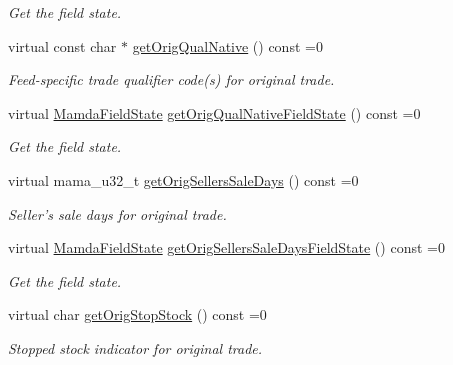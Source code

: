 \begin{CompactItemize}
\begin{CompactList}\small\item\em Get the field state. \item\end{CompactList}\item 
virtual const char $\ast$ \hyperlink{classWombat_1_1MamdaTradeCancelOrError_905aa15d1b3b2b36fe28b395e059231a}{get\-Orig\-Qual\-Native} () const =0
\begin{CompactList}\small\item\em Feed-specific trade qualifier code(s) for original trade. \item\end{CompactList}\item 
virtual \hyperlink{namespaceWombat_93aac974f2ab713554fd12a1fa3b7d2a}{Mamda\-Field\-State} \hyperlink{classWombat_1_1MamdaTradeCancelOrError_9ce7c8f5f35a4a4caacf5ed43637f067}{get\-Orig\-Qual\-Native\-Field\-State} () const =0
\begin{CompactList}\small\item\em Get the field state. \item\end{CompactList}\item 
virtual mama\_\-u32\_\-t \hyperlink{classWombat_1_1MamdaTradeCancelOrError_6df3a025f99a8d6328bcdda0fb4491f1}{get\-Orig\-Sellers\-Sale\-Days} () const =0
\begin{CompactList}\small\item\em Seller's sale days for original trade. \item\end{CompactList}\item 
virtual \hyperlink{namespaceWombat_93aac974f2ab713554fd12a1fa3b7d2a}{Mamda\-Field\-State} \hyperlink{classWombat_1_1MamdaTradeCancelOrError_75ac88d2442d768d3094a8263329adc2}{get\-Orig\-Sellers\-Sale\-Days\-Field\-State} () const =0
\begin{CompactList}\small\item\em Get the field state. \item\end{CompactList}\item 
virtual char \hyperlink{classWombat_1_1MamdaTradeCancelOrError_c7cf998aa454b310389b03c0b8be095e}{get\-Orig\-Stop\-Stock} () const =0
\begin{CompactList}\small\item\em Stopped stock indicator for original trade. \item\end{CompactList}\item 

\end{CompactItemize}
